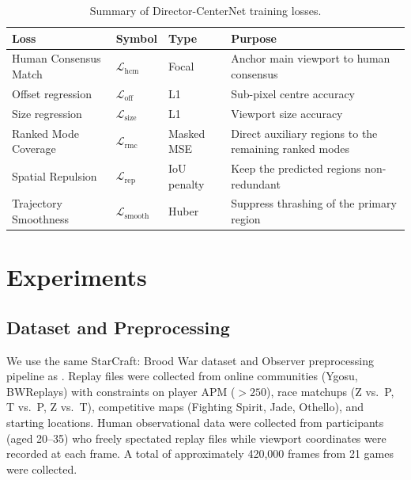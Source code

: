 \documentclass[preprint,12pt]{elsarticle}
\begin{document}
\begin{table}[t]
  \centering
  \caption{Summary of Director-CenterNet training losses.}
  \label{tab:loss_summary}
  \begin{tabular}{llll}
    \toprule
    Loss & Symbol & Type & Purpose \\
    \midrule
    Human Consensus Match & $\mathcal{L}_{\text{hcm}}$ & Focal & 
      Anchor main viewport to human consensus \\
    Offset regression & $\mathcal{L}_{\text{off}}$ & L1 & 
      Sub-pixel centre accuracy \\
    Size regression & $\mathcal{L}_{\text{size}}$ & L1 & 
      Viewport size accuracy \\
    Ranked Mode Coverage & $\mathcal{L}_{\text{rmc}}$ & Masked MSE &
      Direct auxiliary regions to the remaining ranked modes \\
    Spatial Repulsion & $\mathcal{L}_{\text{rep}}$ & IoU penalty &
      Keep the predicted regions non-redundant \\
    Trajectory Smoothness & $\mathcal{L}_{\text{smooth}}$ & Huber &
      Suppress thrashing of the primary region \\
    \bottomrule
  \end{tabular}
\end{table}

\section{Experiments}
\label{sec:experiments}

\subsection{Dataset and Preprocessing}

We use the same StarCraft: Brood War dataset and Observer preprocessing 
pipeline as \cite{joo2023learning, anonymous2025kbrs}. Replay files were 
collected from online communities (Ygosu, BWReplays) with constraints on 
player APM ($>250$), race matchups (Z vs.~P, T vs.~P, Z vs.~T), competitive 
maps (Fighting Spirit, Jade, Othello), and starting locations. Human
observational data were collected from participants (aged 20--35) who freely
spectated replay files while viewport coordinates were recorded at each frame.
A total of approximately 420{,}000 frames from 21 games were collected.
\end{document}
